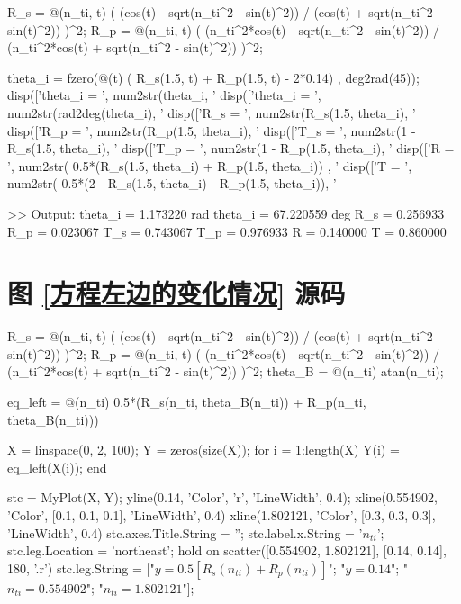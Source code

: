 \documentclass[UTF8]{report}
\theoremstyle{MyLineTheoremStyle} %
\theoremstyle{MyBlockTheoremStyle} %
\theoremstyle{MySubsubsectionStyle} %
\begin{document}
\begin{matlablisting}
R_s = @(n_ti, t) ( (cos(t) - sqrt(n_ti^2 - sin(t)^2)) / (cos(t) + sqrt(n_ti^2 - sin(t)^2)) )^2;
R_p = @(n_ti, t) ( (n_ti^2*cos(t) - sqrt(n_ti^2 - sin(t)^2)) / (n_ti^2*cos(t) + sqrt(n_ti^2 - sin(t)^2)) )^2;

theta_i = fzero(@(t) ( R_s(1.5, t) + R_p(1.5, t) - 2*0.14) , deg2rad(45));
disp(['theta_i = ', num2str(theta_i, '%
disp(['theta_i = ', num2str(rad2deg(theta_i), '%
disp(['R_s = ', num2str(R_s(1.5, theta_i), '%
disp(['R_p = ', num2str(R_p(1.5, theta_i), '%
disp(['T_s = ', num2str(1 - R_s(1.5, theta_i), '%
disp(['T_p = ', num2str(1 - R_p(1.5, theta_i), '%
disp(['R = ', num2str( 0.5*(R_s(1.5, theta_i) + R_p(1.5, theta_i)) , '%
disp(['T = ', num2str( 0.5*(2 - R_s(1.5, theta_i) - R_p(1.5, theta_i)), '%

>> Output:
theta_i = 1.173220 rad
theta_i = 67.220559 deg
R_s = 0.256933
R_p = 0.023067
T_s = 0.743067
T_p = 0.976933
R = 0.140000
T = 0.860000
\end{matlablisting}

\section{图 \ref{方程左边的变化情况} 源码}\label{方程左边的变化情况源码}

\begin{matlablisting}
R_s = @(n_ti, t) ( (cos(t) - sqrt(n_ti^2 - sin(t)^2)) / (cos(t) + sqrt(n_ti^2 - sin(t)^2)) )^2;
R_p = @(n_ti, t) ( (n_ti^2*cos(t) - sqrt(n_ti^2 - sin(t)^2)) / (n_ti^2*cos(t) + sqrt(n_ti^2 - sin(t)^2)) )^2;
theta_B = @(n_ti) atan(n_ti);

eq_left = @(n_ti) 0.5*(R_s(n_ti, theta_B(n_ti)) + R_p(n_ti, theta_B(n_ti)))

X = linspace(0, 2, 100);
Y = zeros(size(X));
for i = 1:length(X)
    Y(i) = eq_left(X(i));
end

stc = MyPlot(X, Y);
yline(0.14, 'Color', 'r', 'LineWidth', 0.4);
xline(0.554902, 'Color', [0.1, 0.1, 0.1], 'LineWidth', 0.4)
xline(1.802121, 'Color', [0.3, 0.3, 0.3], 'LineWidth', 0.4)
stc.axes.Title.String = '';
stc.label.x.String = '$n_{ti}$';
stc.leg.Location = 'northeast';
hold on
scatter([0.554902, 1.802121], [0.14, 0.14], 180, '.r')
stc.leg.String = ["$y =  0.5\left[ R_s(n_{ti}) + R_p(n_{ti}) \right]$"; "$y = 0.14$"; "$n_{ti} = 0.554902$"; "$n_{ti} = 1.802121$"];
\end{matlablisting}

\end{document}
